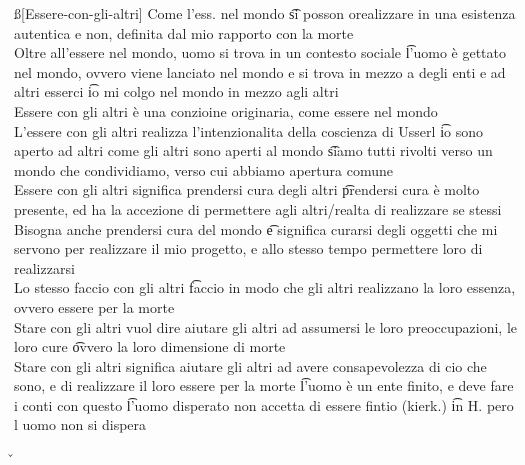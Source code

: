 \documentclass[12pt]{article}
\begin{document}
\ss[Essere-con-gli-altri]
Come l'ess. nel mondo \t si posson orealizzare in una esistenza autentica e non, definita dal mio rapporto con la morte \\
Oltre all'essere nel mondo, uomo si trova in un contesto sociale \t l'uomo è gettato nel mondo, ovvero viene lanciato nel mondo e si trova in mezzo a degli enti e ad altri esserci \t io mi colgo nel mondo in mezzo agli altri \\
Essere con gli altri è una conzioine originaria, come essere nel mondo \\
L'essere con gli altri realizza l'intenzionalita della coscienza di Usserl \t io sono aperto ad altri come gli altri sono aperti al mondo \t siamo tutti rivolti verso un mondo che condividiamo, verso cui abbiamo apertura comune \\
Essere con gli altri significa prendersi cura degli altri \t prendersi cura è molto presente, ed ha la accezione di permettere agli altri/realta di realizzare se stessi \\
Bisogna anche prendersi cura del mondo \t e significa curarsi degli oggetti che mi servono per realizzare il mio progetto, e allo stesso tempo permettere loro di realizzarsi \\
Lo stesso faccio con gli altri \t faccio in modo che gli altri realizzano la loro essenza, ovvero essere per la morte \\
Stare con gli altri vuol dire aiutare gli altri ad assumersi le loro preoccupazioni, le loro cure \t ovvero la loro dimensione di morte \\
Stare con gli altri significa aiutare gli altri ad avere consapevolezza di cio che sono, e di realizzare il loro essere per la morte \t l'uomo è un ente finito, e deve fare i conti con questo \t l'uomo disperato non accetta di essere fintio (kierk.) \t in H. pero l uomo non si dispera

\v
\end{document}
